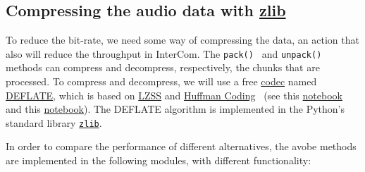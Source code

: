 \subsection{Compressing the audio data with \href{https://zlib.net/}{zlib}}
To reduce the bit-rate, we need some way of compressing the data, an
action that also will reduce the throughput in InterCom. The
\verb|pack() | and \verb|unpack() | methods can compress and
decompress, respectively, the chunks that are processed. To compress
and decompress, we will use a free
\href{https://en.wikipedia.org/wiki/Codec}{codec} named
\href{https://en.wikipedia.org/wiki/DEFLATE}{DEFLATE}, which is based
on
\href{https://en.wikipedia.org/wiki/Lempel%E2%80%93Ziv%E2%80%93Storer%E2%80%93Szymanski}{LZSS}
  and \href{https://en.wikipedia.org/wiki/Huffman_coding}{Huffman
    Coding}~\cite{nelson96datacompression} (see this
  \href{https://github.com/vicente-gonzalez-ruiz/LZ77}{notebook} and
  this
  \href{https://vicente-gonzalez-ruiz.github.io/Huffman_coding/}{notebook}). The
  DEFLATE algorithm is implemented in the Python's standard library
  \href{https://docs.python.org/3/library/zlib.html}{\texttt{zlib}}. %

In order to compare the performance of different alternatives, the
avobe methods are implemented in the following modules, with different
functionality:

